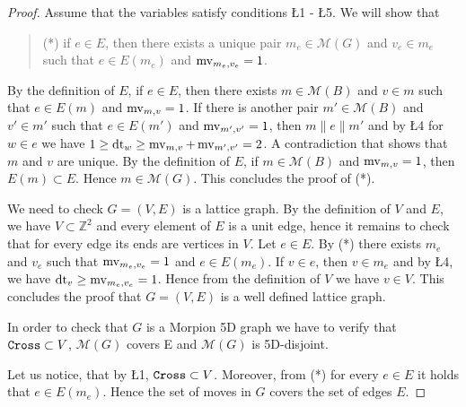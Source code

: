 \begin{proof}  
 Assume that the variables satisfy conditions \L{1} - \L{5}.
  We will show that
  \begin{quote}
  (*) if $e \in E$, then there exists a unique pair $m_e \in \mathcal{M}(G)$ and $v_e \in m_e$ such that $e \in E(m_e)$ and $\operatorname{mv}_{m_e, v_e} = 1$. 
  \end{quote}
  By the definition of $E$, if $e \in E$, then there exists $m \in \mathcal{M}(B)$ and $v \in m$ such that
    $e \in E(m)$ and $\operatorname{mv}_{m, v} = 1$. If there is another pair $m' \in \mathcal{M}(B)$ and $v' \in m'$ such 
    that $e \in E(m')$ and $\operatorname{mv}_{m', v'} = 1$, then $m \parallel e \parallel m'$ and by \L{4} for $w \in e$ we have
    $1 \geq \operatorname{dt}_w \geq \operatorname{mv}_{m, v} + \operatorname{mv}_{m', v'} = 2$. A contradiction that shows that $m$ and $v$ are unique.
  By the definition of $E$, if $m \in \mathcal{M}(B)$ and  $\operatorname{mv}_{m, v} = 1$, then $E(m) \subset E$. Hence
    $m \in \mathcal{M}(G)$.
  This concludes the proof of (*).

  We need to check $G = (V, E)$ is a lattice graph.
  By the definition of $V$ and $E$, we have $V \subset \mathbb{Z}^2$ and every element of $E$ is a unit edge, hence it remains 
to check that for every edge its ends are vertices in $V$.
  Let $e \in E$. By (*) there exists $m_e$ and $v_e$ such that $\operatorname{mv}_{m_e, v_e} = 1$ and $e \in E(m_e)$.
  If $v \in e$, then $v \in m_e$ and by \L{4}, we have $\operatorname{dt}_v \geq \operatorname{mv}_{m_e, v_e} = 1$. Hence from the definition of $V$ we have
$v \in V$. This concludes the proof that 
$G = (V, E)$ is a well defined lattice graph.
  
In order to check that $G$ is a Morpion 5D graph we have to verify that $\texttt{Cross} \subset V$, ${\mathcal M}(G)$ covers E
and ${\mathcal M}(G)$ is 5D-disjoint.

Let us notice, that by \L{1}, $\texttt{Cross} \subset V$. Moreover, from (*) for every $e \in E$ it holds that $e \in E(m_e)$. 
Hence the set of moves in $G$ covers the set of edges $E$.


\end{proof}
